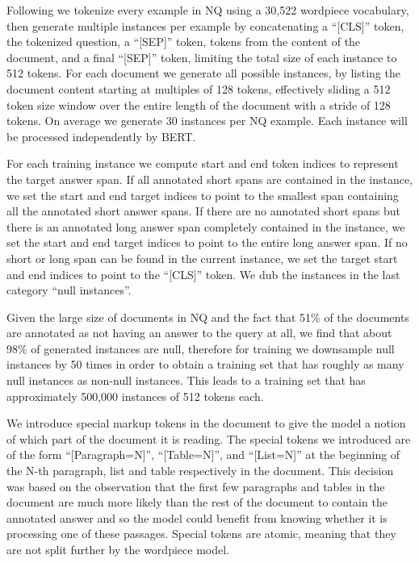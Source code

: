 \documentclass[11pt,a4paper]{article}
\begin{document}
Following  we tokenize every example in NQ using a 30,522 wordpiece vocabulary, then generate multiple instances per example by concatenating a ``[CLS]'' token, the tokenized question, a ``[SEP]'' token, tokens from the content of the document, and a final ``[SEP]'' token, limiting the total size of each instance to 512 tokens. For each document we generate all possible instances, by listing the document content starting at multiples of 128 tokens, effectively sliding a 512 token size window over the entire length of the document with a stride of 128 tokens. On average we generate 30 instances per NQ example. Each instance will be processed independently by BERT.



For each training instance we compute start and end token indices to represent the target answer span. If all annotated short spans are contained in the instance, we set the start and end target indices to point to the smallest span containing all the annotated short answer spans. If there are no annotated short spans but there is an annotated long answer span completely contained in the instance, we set the start and end target indices to point to the entire long answer span. If no short or long span can be found in the current instance, we set the target start and end indices to point to the ``[CLS]'' token. We dub the instances in the last category ``null instances''.

Given the large size of documents in NQ and the fact that 51\% of the documents are annotated as not having an answer to the query at all, we find that about 98\% of generated instances are null, therefore for training we downsample null instances by 50 times in order to obtain a training set that has roughly as many null instances as non-null instances. This leads to a training set that has approximately 500,000 instances of 512 tokens each.

We introduce special markup tokens in the document to give the model a notion of which part of the document it is reading. The special tokens we introduced are of the form ``[Paragraph=N]'', ``[Table=N]'', and ``[List=N]'' at the beginning of the N-th paragraph, list and table respectively in the document. This decision was based on the observation that the first few paragraphs and tables in the document are much more likely than the rest of the document to contain the annotated answer and so the model could benefit from knowing whether it is processing one of these passages. Special tokens are atomic, meaning that they are not split further by the wordpiece model.
\end{document}
